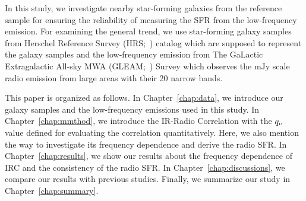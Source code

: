 In this study, we investigate nearby star-forming galaxies from the reference sample for ensuring the reliability of measuring the SFR from the low-frequency emission.
For examining the general trend, we use star-forming galaxy samples from Herschel Reference Survey (HRS;~\citealt{Boselli2010}) catalog which are supposed to represent the galaxy samples and the low-frequency emission from The GaLactic Extragalactic All-sky MWA (GLEAM;~\citealt{Hurley-Walker2017a}) Survey which observes the mJy scale radio emission from large areas with their 20 narrow bands.

This paper is organized as follows.
In Chapter~\ref{chap:data}, we introduce our galaxy samples and the low-frequency emissions used in this study.
In Chapter~\ref{chap:mmthod}, we introduce the IR-Radio Correlation with the $q_{\nu}$ value defined for evaluating the correlation quantitatively. Here, we also mention the way to investigate its frequency dependence and derive the radio SFR\@.
In Chapter~\ref{chap:results}, we show our results about the frequency dependence of IRC and the consistency of the radio SFR\@.
In Chapter~\ref{chap:discussions}, we compare our results with previous studies.
Finally, we summarize our study in Chapter~\ref{chap:summary}.



%
%




